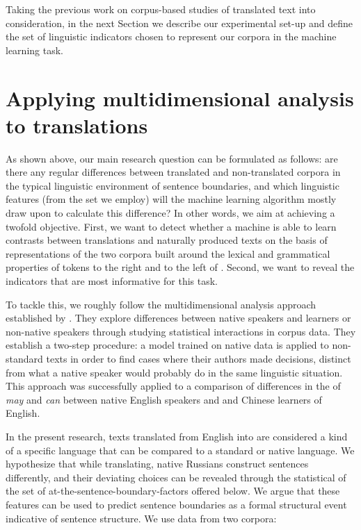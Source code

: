 \documentclass[output=paper]{langsci/langscibook.cls}
\begin{document}
Taking the previous work on corpus-based studies of translated text into consideration, in the next Section we describe our experimental set-up and define the set of linguistic indicators chosen to represent our corpora in the machine learning task. 

\section{Applying multidimensional analysis to translations}\label{sec:mda}

As shown above, our main research question can be formulated as follows: are there any regular differences between translated and non-translated corpora in the typical linguistic environment of sentence boundaries, and which linguistic features (from the set we employ) will the machine learning algorithm mostly draw upon to calculate this difference? In other words, we aim at achieving a twofold objective. First, we want to detect whether a machine is able to learn contrasts between translations and naturally produced texts on the basis of representations of the two corpora built around the lexical and grammatical properties of tokens to the right and to the left of . Second, we want to reveal the indicators that are most informative for this task.

To tackle this, we roughly follow the multidimensional analysis approach established by \citet{Gries:2014}. They explore differences between native speakers and learners or non-native speakers through studying statistical interactions in corpus data. They establish a two-step procedure: a model trained on native data is applied to non-standard texts in order to find cases where their authors made decisions, distinct from what a native speaker would probably do in the same linguistic situation. This approach was successfully applied to a comparison of differences in the  of \textit{may} and \textit{can} between native English speakers and  and Chinese learners of English. 

In the present research, texts translated from English into  are considered a kind of a specific  language  that can be compared to a standard or native language. We hypothesize that while translating, native Russians construct sentences differently, and their deviating choices can be revealed through the statistical  of the set of at-the-sentence-boundary-factors offered below. We argue that these features can be used to predict sentence boundaries as a formal structural event indicative of sentence structure. We use data from two corpora: 
\end{document}
